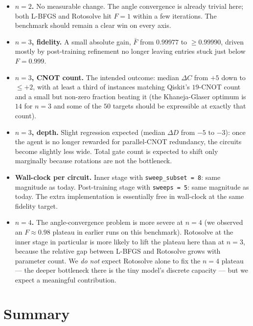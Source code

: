 \documentclass[11pt,a4paper]{article}
\begin{document}
\begin{itemize}[leftmargin=2em]
\item \textbf{$n = 2$.} No measurable change. The angle convergence is
already trivial here; both L-BFGS and Rotosolve hit $F = 1$ within a few
iterations. The benchmark should remain a clear win on every axis.

\item \textbf{$n = 3$, fidelity.} A small absolute gain, $\bar F$ from
$0.99977$ to $\ge 0.99990$, driven mostly by post-training refinement
no longer leaving entries stuck just below $F = 0.999$.

\item \textbf{$n = 3$, CNOT count.} The intended outcome: median
$\Delta C$ from $+5$ down to $\le +2$, with at least a third of
instances matching Qiskit's $19$-CNOT count and a small but non-zero
fraction beating it (the Khaneja-Glaser optimum is $14$ for $n = 3$ and
some of the $50$ targets should be expressible at exactly that count).

\item \textbf{$n = 3$, depth.} Slight regression expected (median
$\Delta D$ from $-5$ to $-3$): once the agent is no longer rewarded for
parallel-CNOT redundancy, the circuits become slightly less wide.
Total gate count is expected to shift only marginally because rotations
are not the bottleneck.

\item \textbf{Wall-clock per circuit.} Inner stage with
\texttt{sweep\_subset = 8}: same magnitude as today. Post-training
stage with \texttt{sweeps = 5}: same magnitude as today. The extra
implementation is essentially free in wall-clock at the same fidelity
target.

\item \textbf{$n = 4$.} The angle-convergence problem is more severe at
$n = 4$ (we observed an $F \approx 0.98$ plateau in earlier runs on
this benchmark). Rotosolve at the inner stage in particular is more
likely to lift the plateau here than at $n = 3$, because the relative
gap between L-BFGS and Rotosolve grows with parameter count. We
\emph{do not} expect Rotosolve alone to fix the $n = 4$ plateau --- the
deeper bottleneck there is the tiny model's discrete capacity --- but
we expect a meaningful contribution.
\end{itemize}

\section{Summary}
\end{document}
